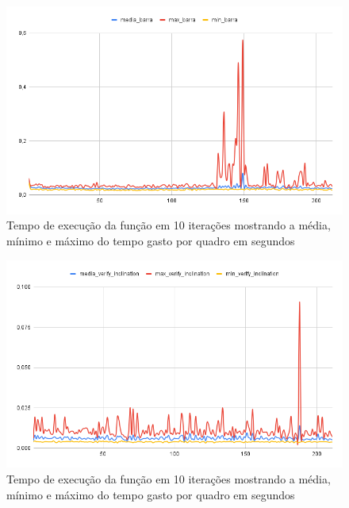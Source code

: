 \begin{figure}[H]
	\centering
	\caption{Tempo de execução da função  em 10 iterações mostrando a média, mínimo e máximo do tempo gasto por quadro em segundos}
	\includegraphics[scale=0.5]{figuras/grafico/barra.png}
\end{figure}

\begin{figure}[H]
	\centering
	\caption{Tempo de execução da função  em 10 iterações mostrando a média, mínimo e máximo do tempo gasto por quadro em segundos}
	\includegraphics[scale=0.5]{figuras/grafico/inclination.png}
\end{figure}


